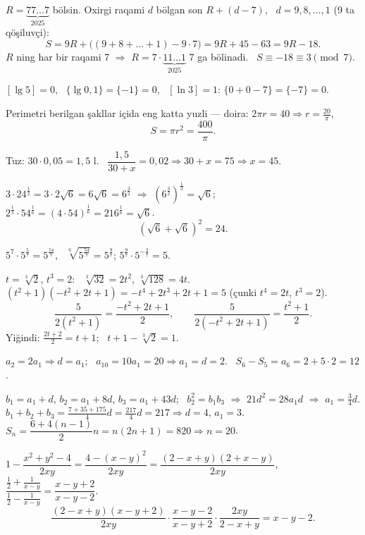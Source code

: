 




$R=\underbrace{77\ldots7}_{2025}$ bölsin. Oxirgi raqami $d$ bölgan son $R+(d-7)$, \ $d=9,8,\dots,1$ (9 ta qöşiluvçi):
\[S=9R+\bigl((9+8+\dots+1)-9\cdot7\bigr)=9R+45-63=9R-18.\]
$R$ ning har bir raqami 7 $\Rightarrow$ $R=7\cdot\underbrace{11\ldots1}_{2025}$ 7 ga bölinadi. \ $S\equiv-18\equiv3\pmod7$.

$[\lg5]=0$, \ $\{\lg0{,}1\}=\{-1\}=0$, \ $[\ln3]=1$: \quad $\{0+0-7\}=\{-7\}=0$.

Perimetri berilgan şakllar içida eng katta yuzli — doira: $2\pi r=40\Rightarrow r=\frac{20}\pi$,
\[S=\pi r^2=\frac{400}\pi.\]

Tuz: $30\cdot0{,}05=1{,}5$ l. \ $\dfrac{1{,}5}{30+x}=0{,}02\Rightarrow30+x=75\Rightarrow x=45$.

$3\cdot24^{\frac12}=3\cdot2\sqrt6=6\sqrt6=6^{\frac32}$ $\Rightarrow$ $\left(6^{\frac32}\right)^{\frac13}=\sqrt6$; \quad $2^{\frac13}\cdot54^{\frac16}=(4\cdot54)^{\frac16}=216^{\frac16}=\sqrt6$.
\[\left(\sqrt6+\sqrt6\right)^2=24.\]

$5^7\cdot5^{\frac57}=5^{\frac{54}7}$, \ $\sqrt[6]{5^{\frac{54}7}}=5^{\frac97}$; \quad $5^{\frac97}\cdot5^{-\frac27}=5$.

$t=\sqrt[3]2$, $t^3=2$: \ $\sqrt[3]{32}=2t^2$, $\sqrt[3]{128}=4t$. \ $(t^2+1)(-t^2+2t+1)=-t^4+2t^3+2t+1=5$ (çunki $t^4=2t$, $t^3=2$).
\[\frac5{2(t^2+1)}=\frac{-t^2+2t+1}2,\qquad\frac5{2(-t^2+2t+1)}=\frac{t^2+1}2.\]
Yiğindi: $\frac{2t+2}2=t+1$; \ $t+1-\sqrt[3]2=1$.

$a_2=2a_1\Rightarrow d=a_1$; \ $a_{10}=10a_1=20\Rightarrow a_1=d=2$. \ $S_6-S_5=a_6=2+5\cdot2=12$.

$b_1=a_1+d$, $b_2=a_1+8d$, $b_3=a_1+43d$; \ $b_2^2=b_1b_3$ $\Rightarrow$ $21d^2=28a_1d$ $\Rightarrow$ $a_1=\frac34d$.\\
$b_1+b_2+b_3=\frac{7+35+175}4d=\frac{217}4d=217\Rightarrow d=4$, $a_1=3$.\\
$S_n=\dfrac{6+4(n-1)}2n=n(2n+1)=820\Rightarrow n=20$.

$1-\dfrac{x^2+y^2-4}{2xy}=\dfrac{4-(x-y)^2}{2xy}=\dfrac{(2-x+y)(2+x-y)}{2xy}$, \quad $\dfrac{\frac12+\frac1{x-y}}{\frac12-\frac1{x-y}}=\dfrac{x-y+2}{x-y-2}$.
\[\frac{(2-x+y)(x-y+2)}{2xy}\cdot\frac{x-y-2}{x-y+2}\cdot\frac{2xy}{2-x+y}=x-y-2.\]

